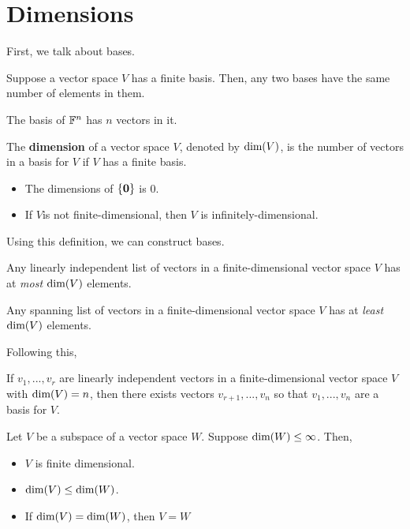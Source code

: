 \section{Dimensions}
First, we talk about bases.

\begin{prop}
    Suppose a vector space $V$ has a finite basis. Then, any two bases have the same number of elements in them.
\end{prop}

\begin{corollary}
    The basis of $\mathbb{F}^n$ has $n$ vectors in it.
\end{corollary}

\begin{definition}
    The \textbf{dimension} of a vector space $V$, denoted by $\text{dim}(V)$, is the number of vectors in a basis for $V$ if $V$ has a finite basis.
    \begin{itemize}
        \item The dimensions of $\{ \mathbf{0} \}$ is $0$.
        \item If $V$is not finite-dimensional, then $V$ is infinitely-dimensional.
    \end{itemize}
\end{definition}

Using this definition, we can construct bases.
\begin{prop}
    Any linearly independent list of vectors in a finite-dimensional vector space $V$ has at \textit{most} $\text{dim}(V)$ elements.
\end{prop}

\begin{prop}
    Any spanning list of vectors in a finite-dimensional vector space $V$ has at \textit{least} $\text{dim}(V)$ elements.
\end{prop}

Following this,
\begin{thm}
    If $v_1, ..., v_r$ are linearly independent vectors in a finite-dimensional vector space $V$ with $\text{dim}(V) = n$, then there exists vectors
    $v_{r + 1}, ..., v_n$ so that $v_1, ..., v_n$ are a basis for $V$.
\end{thm}

\begin{thm}
    Let $V$ be a subspace of a vector space $W$. Suppose $\text{dim}(W) \leq \infty$. Then,
    \begin{itemize}
        \item $V$ is finite dimensional.
        \item $\text{dim}(V) \leq \text{dim}(W)$.
        \item If $\text{dim}(V) = \text{dim}(W)$, then $V = W$
    \end{itemize}
\end{thm}